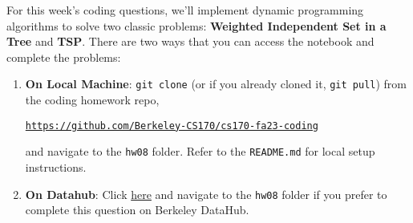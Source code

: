\documentclass[11pt]{article}
\begin{document}
For this week’s coding questions, we'll implement dynamic programming algorithms to solve two classic problems: \textbf{Weighted Independent Set in a Tree} and \textbf{TSP}.  There are two ways that you can access the notebook and complete the problems:
\begin{enumerate}
    \item \textbf{On Local Machine}: \texttt{git clone} (or if you already cloned it, \texttt{git pull}) from the coding homework repo, 
    
    \textcolor{blue}{\href{https://github.com/Berkeley-CS170/cs170-fa23-coding}{\texttt{https://github.com/Berkeley-CS170/cs170-fa23-coding}}}
    
    and navigate to the \texttt{hw08} folder. Refer to the \texttt{README.md} for local setup instructions.

    \item \textbf{On Datahub}: Click \textcolor{blue}{\href{https://datahub.berkeley.edu/hub/user-redirect/git-pull?repo=https://github.com/Berkeley-CS170/cs170-fa23-coding}{here}} and navigate to the \texttt{hw08} folder if you prefer to complete this question on Berkeley DataHub.
\end{enumerate}
\end{document}
